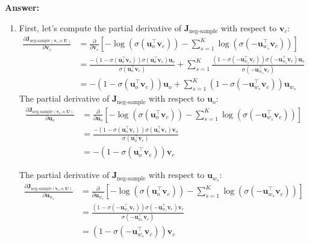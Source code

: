 \documentclass{article}
\newenvironment{answer}{
    {\bf Answer:} \sf \begingroup\color{red}
}{\endgroup}%
\begin{document}
\begin{enumerate}[label=(\alph*)]
\begin{shaded}
\begin{answer}
\begin{enumerate}[label=(\roman*)]
    \item First, let's compute the partial derivative of $\bm J_{\text{neg-sample}}$ with respect to $\bm v_c$:
    \begin{align}
        \frac{\partial \bm J_{\text{neg-sample}(\bm v_c, o, \bm U)}}{\partial \bm v_c} &= \frac{\partial}{\partial \bm v_c} \left[-\log(\sigma(\bm u_o^\top \bm v_c)) - \sum_{s=1}^K \log(\sigma(-\bm u_{w_s}^\top \bm v_c))\right] \\
        &= \frac{-(1 - \sigma(\bm u_o^\top \bm v_c))\sigma(\bm u_o^\top \bm v_c) \bm u_o}{\sigma(\bm u_o^\top \bm v_c)} + \sum_{s=1}^K \frac{(1 - \sigma(-\bm u_{w_s}^\top \bm v_c))\sigma(-\bm u_{w_s}^\top \bm v_c) \bm u_o}{\sigma(-\bm u_{w_s}^\top \bm v_c)} \\
        &= -( 1 - \sigma(\bm u_o^\top \bm v_c) ) \bm u_o + \sum_{s=1}^{K} \left( 1 - \sigma(- \bm u_{w_s}^\top \bm v_c) \right) \bm u_{w_s}
    \end{align}
    \color{red}
    The partial derivative of $\bm J_{\text{neg-sample}}$ with respect to $\bm u_o$:
    \begin{align}
        \frac{\partial \bm J_{\text{neg-sample}(\bm v_c, o, \bm U)}}{\partial \bm u_o} &= \frac{\partial}{\partial \bm u_o} \left[-\log(\sigma(\bm u_o^\top \bm v_c)) - \sum_{s=1}^K \log(\sigma(-\bm u_{w_s}^\top \bm v_c))\right] \\
        &= \frac{-(1 - \sigma(\bm u_o^\top \bm v_c))\sigma(\bm u_o^\top \bm v_c) \bm v_o}{\sigma(\bm u_o^\top \bm v_c)} \\
        &= -( 1 - \sigma(\bm u_o^\top \bm v_c) ) \bm v_c
    \end{align}

    The partial derivative of $\bm J_{\text{neg-sample}}$ with respect to $\bm u_{w_s}$:
    \begin{align}
        \frac{\partial \bm J_{\text{neg-sample}(\bm v_c, o, \bm U)}}{\partial \bm u_{w_s}} &= \frac{\partial}{\partial \bm u_{w_s}} \left[-\log(\sigma(\bm u_o^\top \bm v_c)) - \sum_{s=1}^K \log(\sigma(-\bm u_{w_s}^\top \bm v_c))\right] \\
        &= \frac{(1 - \sigma(-\bm u_{w_s}^\top \bm v_c))\sigma(-\bm u_{w_s}^\top \bm v_c) \bm v_c}{\sigma(-\bm u_{w_s}^\top \bm v_c)} \\
        &= ( 1 - \sigma(- \bm u_{w_s}^\top \bm v_c) ) \bm v_c
    \end{align}


\end{enumerate}
\end{answer}
\end{shaded}
\end{enumerate}
\end{document}
